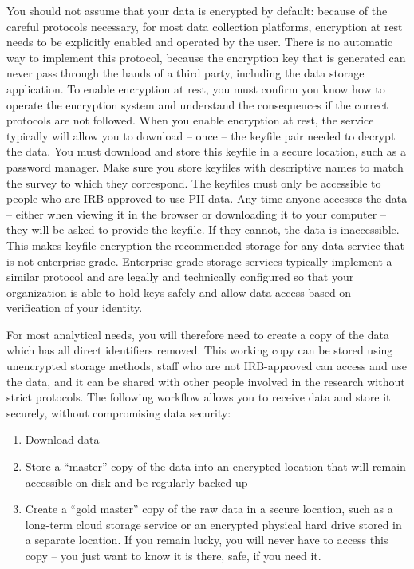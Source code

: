 You should not assume that your data is encrypted by default:
because of the careful protocols necessary, for most data collection platforms,
encryption at rest needs to be explicitly enabled and operated by the user.
There is no automatic way to implement this protocol,
because the encryption key that is generated
can never pass through the hands of a third party, including the data storage application.
To enable encryption at rest, you must confirm
you know how to operate the encryption system
and understand the consequences if the correct protocols are not followed.
When you enable encryption at rest, the service typically will allow you to download -- once --
the keyfile pair needed to decrypt the data.
You must download and store this keyfile in a secure location, such as a password manager.
Make sure you store keyfiles with descriptive names to match the survey to which they correspond.
The keyfiles must only be accessible to people who are IRB-approved to use PII data.
Any time anyone accesses the data -- either when viewing it in the browser or downloading it to your computer -- they will be asked to provide the keyfile.
If they cannot, the data is inaccessible.
This makes keyfile encryption the recommended storage for any data service
that is not enterprise-grade.
Enterprise-grade storage services typically implement a similar protocol
and are legally and technically configured so that your organization
is able to hold keys safely and allow data access based on verification of your identity.

For most analytical needs, you will therefore need to create
a copy of the data which has all direct identifiers removed.
This working copy can be stored using unencrypted storage methods,
staff who are not IRB-approved can access and use the data,
and it can be shared with other people involved in the research without strict protocols.
The following workflow allows you to receive data and store it securely,
without compromising data security:

\begin{enumerate}
	\item Download data
	\item Store a ``master'' copy of the data into an encrypted location that will remain accessible on disk and be regularly backed up
	\item Create a ``gold master'' copy of the raw data in a secure location, such as a long-term cloud storage service or an encrypted physical hard drive stored in a separate location. If you remain lucky, you will never have to access this copy -- you just want to know it is there, safe, if you need it.

\end{enumerate}

